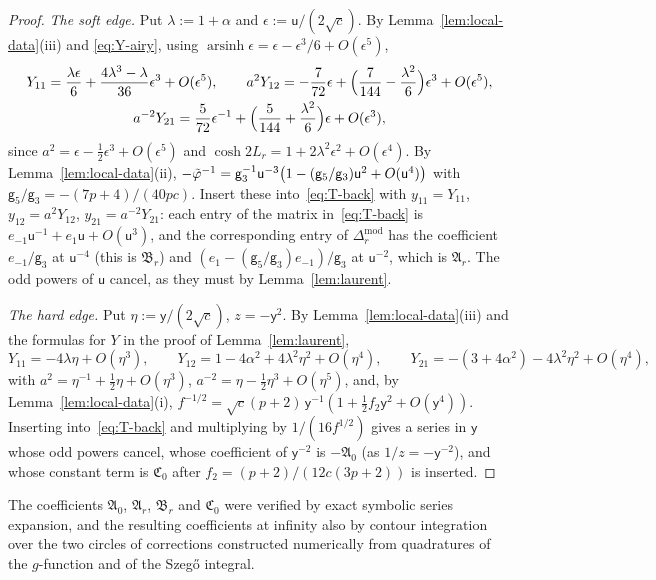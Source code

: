 \begin{proof}
\emph{The soft edge.} Put $\lambda:=1+\alpha$ and $\epsilon:=\mathsf u/(2\sqrt c)$. By Lemma~\ref{lem:local-data}(iii) and
\eqref{eq:Y-airy}, using $\operatorname{arsinh}\epsilon=\epsilon-\epsilon^3/6+O(\epsilon^5)$,
\begin{gather*}
  Y_{11}=\frac{\lambda\epsilon}6+\frac{4\lambda^3-\lambda}{36}\epsilon^3+O(\epsilon^5),\qquad
  a^2Y_{12}=-\frac7{72}\epsilon+\Bigl(\frac7{144}-\frac{\lambda^2}6\Bigr)\epsilon^3+O(\epsilon^5),\\
  a^{-2}Y_{21}=\frac5{72}\epsilon^{-1}+\Bigl(\frac5{144}+\frac{\lambda^2}6\Bigr)\epsilon+O(\epsilon^3),
\end{gather*}
since $a^2=\epsilon-\frac12\epsilon^3+O(\epsilon^5)$ and $\cosh2L_r=1+2\lambda^2\epsilon^2+O(\epsilon^4)$. By Lemma~\ref{lem:local-data}(ii),
$-\tilde\varphi^{-1}=\mathsf g_3^{-1}\mathsf u^{-3}\bigl(1-(\mathsf g_5/\mathsf g_3)\mathsf u^2+O(\mathsf u^4)\bigr)$ with $\mathsf g_5/\mathsf g_3=-(7p+4)/(40pc)$.
Insert these into~\eqref{eq:T-back} with $y_{11}=Y_{11}$, $y_{12}=a^2Y_{12}$, $y_{21}=a^{-2}Y_{21}$: each entry of the matrix
in~\eqref{eq:T-back} is $e_{-1}\mathsf u^{-1}+e_1\mathsf u+O(\mathsf u^3)$, and the corresponding entry of $\Delta_r^{\mathrm{mod}}$ has the
coefficient $e_{-1}/\mathsf g_3$ at $\mathsf u^{-4}$ (this is $\mathfrak B_r$) and $(e_1-(\mathsf g_5/\mathsf g_3)e_{-1})/\mathsf g_3$ at
$\mathsf u^{-2}$, which is $\mathfrak A_r$. The odd powers of $\mathsf u$ cancel, as they must by Lemma~\ref{lem:laurent}.

\emph{The hard edge.} Put $\eta:=\mathsf y/(2\sqrt c)$, $z=-\mathsf y^2$. By Lemma~\ref{lem:local-data}(iii) and the formulas
for $Y$ in the proof of Lemma~\ref{lem:laurent},
\[
  Y_{11}=-4\lambda\eta+O(\eta^3),\qquad Y_{12}=1-4\alpha^2+4\lambda^2\eta^2+O(\eta^4),\qquad Y_{21}=-(3+4\alpha^2)-4\lambda^2\eta^2+O(\eta^4),
\]
with $a^2=\eta^{-1}+\frac12\eta+O(\eta^3)$, $a^{-2}=\eta-\frac12\eta^3+O(\eta^5)$, and, by Lemma~\ref{lem:local-data}(i),
$f^{-1/2}=\sqrt c(p+2)\,\mathsf y^{-1}(1+\frac12f_2\mathsf y^2+O(\mathsf y^4))$. Inserting into~\eqref{eq:T-back} and multiplying by
$1/(16f^{1/2})$ gives a series in $\mathsf y$ whose odd powers cancel, whose coefficient of $\mathsf y^{-2}$ is $-\mathfrak A_0$ (as
$1/z=-\mathsf y^{-2}$), and whose constant term is $\mathfrak C_0$ after $f_2=(p+2)/(12c(3p+2))$ is inserted.
\end{proof}

The coefficients $\mathfrak A_0$, $\mathfrak A_r$, $\mathfrak B_r$ and $\mathfrak C_0$ were verified by exact symbolic series expansion,
and the resulting coefficients at infinity also by contour integration over the two circles of corrections constructed
numerically from quadratures of the $g$-function and of the Szeg\H{o} integral.
